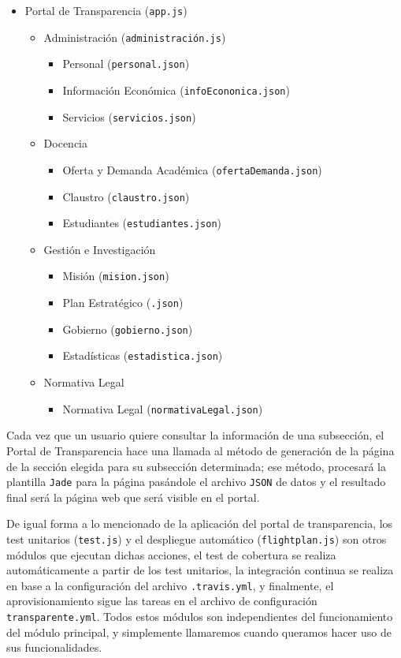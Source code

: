 \newpage
\begin{itemize}
 \item Portal de Transparencia ({\tt app.js})
 \begin{itemize}
  \item Administración ({\tt administración.js})
  \begin{itemize}
   \item Personal ({\tt personal.json})
   \item Información Económica ({\tt infoEcononica.json})
   \item Servicios ({\tt servicios.json})
  \end{itemize}
  \item Docencia
  \begin{itemize}
   \item Oferta y Demanda Académica ({\tt ofertaDemanda.json})
   \item Claustro ({\tt claustro.json})
   \item Estudiantes ({\tt estudiantes.json})
  \end{itemize}
  \item Gestión e Investigación
  \begin{itemize}
   \item Misión ({\tt mision.json})
   \item Plan Estratégico ({\tt .json})
   \item Gobierno ({\tt gobierno.json})
   \item Estadísticas ({\tt estadistica.json})
  \end{itemize}
  \item Normativa Legal
  \begin{itemize}
   \item Normativa Legal ({\tt normativaLegal.json})
  \end{itemize}
 \end{itemize}
\end{itemize}

Cada vez que un usuario quiere consultar la información de una subsección, el Portal de Transparencia hace una llamada al método
de generación de la página de la sección elegida para su subsección determinada; ese método, procesará la plantilla {\tt Jade}
para la página pasándole el archivo {\tt JSON} de datos y el resultado final será la página web que será visible en el portal.

\bigskip
De igual forma a lo mencionado de la aplicación del portal de transparencia, los test unitarios ({\tt test.js}) y el 
despliegue automático ({\tt flightplan.js}) son otros módulos que ejecutan dichas acciones, el test de cobertura se realiza
automáticamente a partir de los test unitarios, la integración continua se realiza en base a la configuración del archivo 
{\tt .travis.yml}, y finalmente, el aprovisionamiento sigue las tareas en el archivo de configuración {\tt transparente.yml}. 
Todos estos módulos son independientes del funcionamiento del módulo principal, y simplemente llamaremos cuando queramos hacer 
uso de sus funcionalidades.

